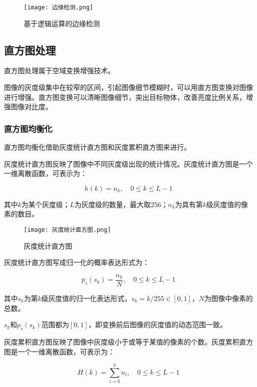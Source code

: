 \documentclass[cn, blue, normal, 12pt]{elegantnote}
\begin{document}
{\begin{figure}[htbp]
    \centering
    \texttt{[image: 边缘检测.png]}
    \caption{基于逻辑运算的边缘检测}
\end{figure}

\subsection{直方图处理}

直方图处理属于空域变换增强技术。

图像的灰度级集中在较窄的区间，引起图像细节模糊时，可以用直方图变换对图像进行增强。直方图变换可以清晰图像细节，突出目标物体，改善亮度比例关系，增强图像对比度。

\subsubsection{直方图均衡化}

直方图均衡化借助灰度统计直方图和灰度累积直方图来进行。

灰度统计直方图反映了图像中不同灰度级出现的统计情况。灰度统计直方图是一个一维离散函数，可表示为：

\begin{equation}
    h(k)=n_k, \quad 0\leq k \leq L-1
\end{equation}

其中$k$为某个灰度级；$L$为灰度级的数量，最大取256；$n_k$为具有第$k$级灰度值的像素的数目。

\begin{figure}[htbp]
    \centering
    \texttt{[image: 灰度统计直方图.png]}
    \caption{灰度统计直方图}
\end{figure}

灰度统计直方图写成归一化的概率表达形式为：

\begin{equation}
    p_s(s_k)=\frac{n_k}{N}, \quad 0\leq k \leq L-1
\end{equation}

其中$s_k$为第$k$级灰度值的归一化表达形式，$s_k=k/255\in[0,1]$，$N$为图像中像素的总数。

$s_k$和$p_s(s_k)$范围都为$[0,1]$，即变换前后图像的灰度值的动态范围一致。

灰度累积直方图反映了图像中灰度级小于或等于某值的像素的个数。灰度累积直方图是一个一维离散函数，可表示为：

\begin{equation}
    H(k)=\sum_{i=0}^{k}n_i, \quad 0\leq k \leq L-1
\end{equation}

}
\end{document}
